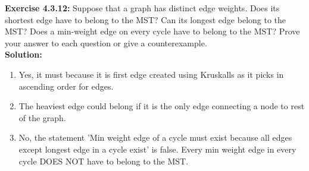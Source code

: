\documentclass[11pt,fleqn]{article}
\newcommand{\be}{\begin{enumerate}}
\newcommand{\ee}{\end{enumerate}}
\begin{document}
\textbf{Exercise 4.3.12:} Suppose that a graph has distinct edge weights. Does its shortest edge have to
belong to the MST? Can its longest edge belong to the MST? Does a min-weight edge
on every cycle have to belong to the MST? Prove your answer to each question or give
a counterexample.\\

\textbf{Solution:}
\be
	\item Yes, it must because it is first edge created using Kruskalls as it picks in ascending order for edges.
	
	\item The heaviest edge could belong if it is the only edge connecting a node to rest of the graph.
	
	\item No, the statement 'Min weight edge of a cycle must exist because all edges except longest edge in a cycle exist' is false. Every min weight edge in every cycle DOES NOT have to belong to the MST.
\ee


	
\end{document}
